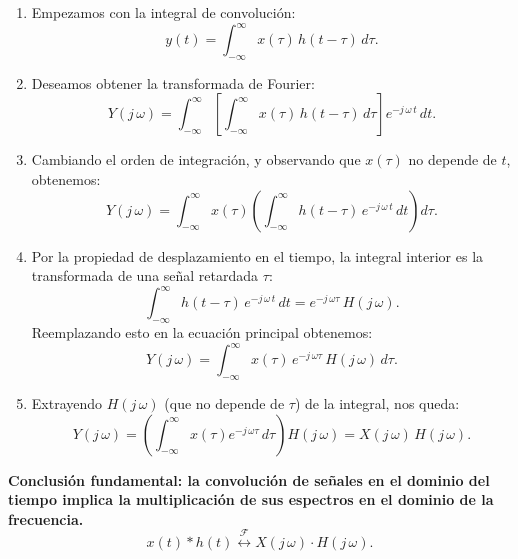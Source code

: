 \begin{enumerate}
	\item Empezamos con la integral de convolución:
	\begin{equation}
		y(t) = \int_{-\infty}^{\infty} x(\tau) \, h(t-\tau) \, d\tau .
	\end{equation}
	\item Deseamos obtener la transformada de Fourier:
	\begin{equation}
		Y(j \, \omega) = \int_{-\infty}^{\infty} \left[ \int_{-\infty}^{\infty} x(\tau) \, h(t-\tau) \, d\tau \right] e^{-j \, \omega \, t} \, dt.
	\end{equation}
	\item Cambiando el orden de integración, y observando que $x(\tau)$ no depende de $t$, obtenemos:
	\begin{equation}
		Y(j \, \omega) = \int_{-\infty}^{\infty} x(\tau) \left( \int_{-\infty}^{\infty} h(t-\tau) \, e^{-j \, \omega \, t} \, dt \right) d\tau .
	\end{equation}
	\item Por la propiedad de desplazamiento en el tiempo, la integral interior es la transformada de una señal retardada $\tau$:
	\begin{equation}
		\int_{-\infty}^{\infty} h(t-\tau) \, e^{-j \, \omega \, t} \, dt = e^{-j \, \omega \tau} \, H(j \, \omega).
	\end{equation}
	Reemplazando esto en la ecuación principal obtenemos:
	\begin{equation}
		Y(j \, \omega) = \int_{-\infty}^{\infty} x(\tau) \, e^{-j \, \omega\tau} \, H(j \, \omega) \, d\tau .
	\end{equation}
	\item Extrayendo $H(j \, \omega)$ (que no depende de $\tau$) de la integral, nos queda:
	\begin{equation}
		Y(j \, \omega) = \left( \int_{-\infty}^{\infty} x(\tau) e^{-j \, \omega \tau} \, d\tau \right) H(j \, \omega) = X(j \, \omega) \, H(j \, \omega) .
	\end{equation}
\end{enumerate}

\textbf{Conclusión fundamental: la convolución de señales en el dominio del tiempo implica la multiplicación de sus espectros en el dominio de la frecuencia.}
\begin{equation}
	x(t) * h(t) \stackrel{\mathcal{F}}{\longleftrightarrow} X(j \, \omega) \cdot H(j \, \omega) .
\end{equation}

